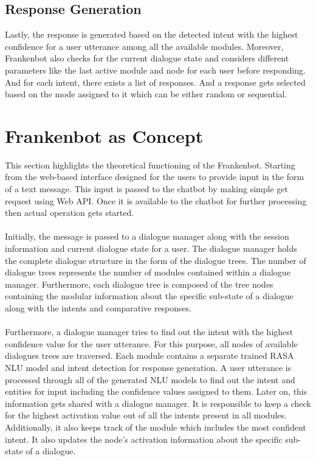 \subsection{Response Generation}
Lastly, the response is generated based on the detected intent with the highest confidence for a user utterance among all the available modules. Moreover, Frankenbot also checks for the current dialogue state and considers different parameters like the last active module and node for each user before responding. And for each intent, there exists a list of responses. And a response gets selected based on the mode assigned to it which can be either random or sequential.  

\section{Frankenbot as Concept}
This section highlights the theoretical functioning of the Frankenbot. Starting from the web-based interface designed for the users to provide input in the form of a text message. This input is passed to the chatbot by making simple get request using Web API. Once it is available to the chatbot for further processing then actual operation gets started.
\\~\\
Initially, the message is passed to a dialogue manager along with the session information and current dialogue state for a user. The dialogue manager holds the complete dialogue structure in the form of the dialogue trees. The number of dialogue trees represents the number of modules contained within a dialogue manager. Furthermore, each dialogue tree is composed of the tree nodes containing the modular information about the specific sub-state of a dialogue along with the intents and comparative responses.
\\~\\
Furthermore, a dialogue manager tries to find out the intent with the highest confidence value for the user utterance. For this purpose, all nodes of available dialogues trees are traversed. Each module contains a separate trained RASA NLU model and intent detection for response generation. A user utterance is processed through all of the generated NLU models to find out the intent and entities for input including the confidence values assigned to them. Later on, this information gets shared with a dialogue manager. It is responsible to keep a check for the highest activation value out of all the intents present in all modules. Additionally, it also keeps track of the module which includes the most confident intent. It also updates the node's activation information about the specific sub-state of a dialogue.
